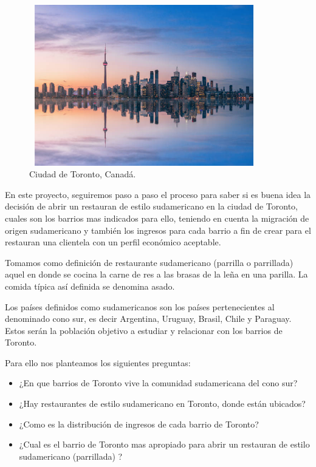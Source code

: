 \documentclass[11pt,a4paper,sans, spanish]{article}
\begin{document}
\begin{center}
	\begin{figure}[H]
	\includegraphics[width=10cm, height=7cm]{Toronto}
	\caption[Ciudad de Toronto]{Ciudad de Toronto, Canadá.}
	\label{fig:toronto}
	\end{figure}
\end{center}

En este proyecto, seguiremos paso a paso el proceso para saber si es buena idea la decisión de abrir un restauran de estilo sudamericano en la ciudad de Toronto, cuales son los barrios mas indicados para ello, teniendo en cuenta la migración de origen sudamericano y también los ingresos para cada barrio a fin de  crear para el restauran una clientela con un perfil económico aceptable.

Tomamos como definición de restaurante sudamericano (parrilla o parrillada) aquel en donde se cocina la carne de res a las brasas de la leña en una parilla. La comida típica así definida se denomina asado.

Los países definidos como sudamericanos son los países pertenecientes al denominado cono sur, es decir Argentina, Uruguay, Brasil, Chile y Paraguay. Estos serán la población objetivo  a estudiar y relacionar con los barrios de Toronto.  

Para ello nos planteamos los siguientes preguntas:
\begin{itemize}
	\item  ¿En que barrios de Toronto vive la comunidad sudamericana del cono sur? 
	\item  ¿Hay restaurantes de estilo sudamericano en Toronto, donde están ubicados? 
	\item  ¿Como es la distribución de ingresos de cada barrio de Toronto?
	\item  ¿Cual es el barrio de Toronto mas apropiado para abrir un restauran de estilo sudamericano (parrillada) ?  
\end{itemize}
\end{document}
